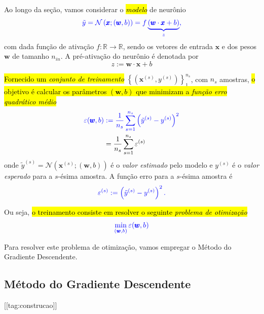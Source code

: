 Ao longo da seção, vamos considerar o \hl{\emph{modelo}} de neurônio
\begin{equation}
  \color{blue}\tilde{y} = \mathcal{N}\left(\pmb{x}; (\pmb{w}, b)\right) = f\underbrace{(\pmb{w}\cdot\pmb{x} + b)}_{z},
\end{equation}
com dada função de ativação $f:\mathbb{R}\to\mathbb{R}$, sendo os vetores de entrada $\pmb{x}$ e dos pesos $\pmb{w}$ de tamanho $n_{in}$. A pré-ativação do neurônio é denotada por
\begin{equation}
  z := \pmb{w}\cdot\pmb{x} + b
\end{equation}

\hl{Fornecido um \emph{conjunto de treinamento}} $\left\{\left(\pmb{x}^{(s)}, y^{(s)}\right)\right\}_1^{n_s}$, com $n_s$ amostras, \hl{o objetivo é calcular os parâmetros $(\pmb{w}, b)$ que minimizam a \emph{função erro quadrático médio}}
\begin{align}\label{eq:percep_mse}
  \color{blue}\varepsilon(\pmb{w}, b) &\color{blue}:= \frac{1}{n_s}\sum_{s=1}^{n_s}\left(\tilde{y}^{(s)} - y^{(s)}\right)^2\\
                          &= \frac{1}{n_s}\sum_{s=1}^{n_s}\varepsilon^{(s)}
\end{align}
onde $\tilde{y}^{(s)} = \mathcal{N}\left(\pmb{x}^{(s)}; (\pmb{w}, b)\right)$ é o \emph{valor estimado} pelo modelo e $y^{(s)}$ é o \emph{valor esperado} para a $s$-ésima amostra. A função erro para a $s$-ésima amostra é
\begin{equation}\color{blue}\varepsilon^{(s)} := \left(\tilde{y}^{(s)} - y^{(s)}\right)^2.
\end{equation}

Ou seja, \hl{o treinamento consiste em resolver o seguinte \emph{problema de otimização}}
\begin{equation}\color{blue}\min_{(\pmb{w}, b)}\varepsilon(\pmb{w}, b)
\end{equation}

Para resolver este problema de otimização, vamos empregar o Método do Gradiente Descendente.

\subsection{Método do Gradiente Descendente}
[[tag:construcao]]

